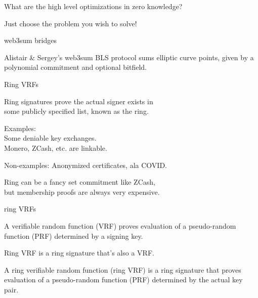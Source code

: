 \documentclass{beamer}
\begin{document}
\begin{frame}

What are the high level optimizations in zero knowledge?

\bigskip\bigskip

\hspace{20pt} Just choose the problem you wish to solve!


\end{frame}


\begin{frame}{web3sum bridges}

Alistair \& Sergey's web3sum BLS protocol sums elliptic curve points,
given by a polynomial commitment and optional bitfield. \\



\end{frame}


\begin{frame}{Ring VRFs}

Ring signatures prove the actual signer exists in \\
\hspace{5pt} some publicly specified list, known as the ring.

\bigskip\bigskip

Examples: \\
\hspace{5pt}  Some deniable key exchanges. \\
\hspace{5pt}  Monero, ZCash, etc. are linkable. 

\medskip

Non-examples:  Anonymized certificates, ala COVID.

\bigskip\bigskip

Ring can be a fancy set commitment like ZCash, \\
\hspace{5pt} but membership proofs are always very expensive.
	
\end{frame}



\begin{frame}{ring VRFs}

A verifiable random function (VRF) proves evaluation of a pseudo-random function (PRF) determined by a signing key.

\bigskip\bigskip

Ring VRF is a ring signature that's also a VRF.

\bigskip

A ring verifiable random function (ring VRF) is a ring signature that proves evaluation of a pseudo-random function (PRF) determined by the actual key pair.

\end{frame}
\end{document}
